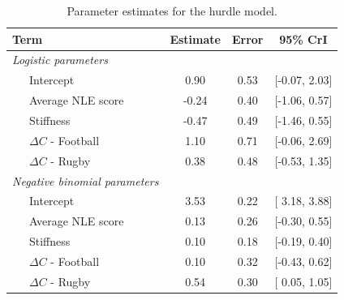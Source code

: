 \documentclass[
  english,
  man,floatsintext]{apa6}
\begin{document}
\begin{table}[H]

\begin{center}
\begin{threeparttable}

\caption{\label{tab:hurdlemodel}Parameter estimates for the hurdle model.}

\begin{tabular}{lccc}
\toprule
Term & Estimate & Error & 95\% CrI\\
\midrule
\textit{Logistic parameters} &  &  & \\
\ \ \ Intercept & 0.90 & 0.53 & [-0.07, 2.03]\\
\ \ \ Average NLE score & -0.24 & 0.40 & [-1.06, 0.57]\\
\ \ \ Stiffness & -0.47 & 0.49 & [-1.46, 0.55]\\
\ \ \ $\Delta C$ - Football & 1.10 & 0.71 & [-0.06, 2.69]\\
\ \ \ $\Delta C$ - Rugby & 0.38 & 0.48 & [-0.53, 1.35]\\
\textit{Negative binomial parameters} &  &  & \\
\ \ \ Intercept & 3.53 & 0.22 & [ 3.18, 3.88]\\
\ \ \ Average NLE score & 0.13 & 0.26 & [-0.30, 0.55]\\
\ \ \ Stiffness & 0.10 & 0.18 & [-0.19, 0.40]\\
\ \ \ $\Delta C$ - Football & 0.10 & 0.32 & [-0.43, 0.62]\\
\ \ \ $\Delta C$ - Rugby & 0.54 & 0.30 & [ 0.05, 1.05]\\
\bottomrule
\end{tabular}

\end{threeparttable}
\end{center}

\end{table}
\end{document}

